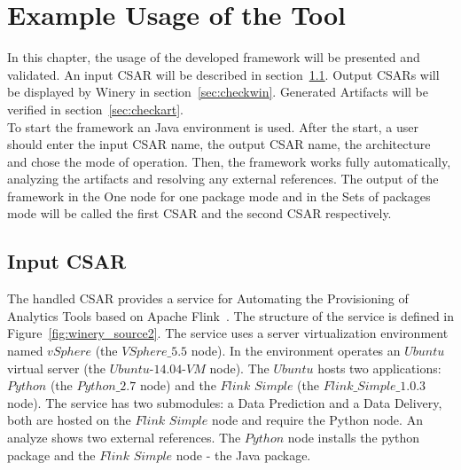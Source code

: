 
\chapter{Example Usage of the Tool}\label{chap:check}
In this chapter, the usage of the developed framework will be presented and validated.
An input CSAR will be described in section~\ref{sec:inputcsar}.
Output CSARs will be displayed by Winery in section~\ref{sec:checkwin}.
Generated Artifacts will be verified in section~\ref{sec:checkart}.\\
To start the framework an Java environment is used.
After the start, a user should enter the input CSAR name, the output CSAR name, the architecture and chose the mode of operation.
Then, the framework works fully automatically, analyzing the artifacts and resolving any external references.
The output of the framework in the One node for one package mode and in the Sets of packages mode will be called the first CSAR and the second CSAR respectively.

\section{Input CSAR}\label{sec:inputcsar}
The handled CSAR provides a service for Automating the Provisioning of Analytics Tools based on Apache Flink~\cite{csar_test}.
The structure of the service is defined in Figure~\ref{fig:winery_source2}. 
The service uses a server virtualization environment named $vSphere$ (the $VSphere\_5.5$ node). 
In the environment operates an $Ubuntu$ virtual server (the $Ubuntu$-$14.04$-$VM$ node).
The $Ubuntu$ hosts two applications: $Python$ (the $Python\_2.7$ node) and the $Flink$ $Simple$ (the $Flink\_Simple\_1.0.3$ node).
The service has two submodules: a Data Prediction and a Data Delivery, both are hosted on the $Flink$ $Simple$ node and require the Python node. 
An analyze shows two external references. The $Python$ node installs the python package and the $Flink$ $Simple$ node - the Java package. 
